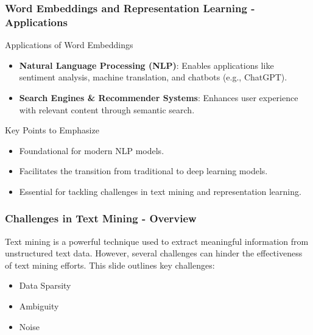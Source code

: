 \documentclass[aspectratio=169]{beamer}
\begin{document}
\begin{frame}[fragile]
    \frametitle{Word Embeddings and Representation Learning - Applications}
    \begin{block}{Applications of Word Embeddings}
        \begin{itemize}
            \item \textbf{Natural Language Processing (NLP)}: Enables applications like sentiment analysis, machine translation, and chatbots (e.g., ChatGPT).
            \item \textbf{Search Engines \& Recommender Systems}: Enhances user experience with relevant content through semantic search.
        \end{itemize}
    \end{block}
    
    \begin{block}{Key Points to Emphasize}
        \begin{itemize}
            \item Foundational for modern NLP models.
            \item Facilitates the transition from traditional to deep learning models.
            \item Essential for tackling challenges in text mining and representation learning.
        \end{itemize}
    \end{block}
\end{frame}

\begin{frame}[fragile]
    \frametitle{Challenges in Text Mining - Overview}
    Text mining is a powerful technique used to extract meaningful information from unstructured text data. However, several challenges can hinder the effectiveness of text mining efforts. This slide outlines key challenges:
    \begin{itemize}
        \item Data Sparsity
        \item Ambiguity
        \item Noise
    \end{itemize}
\end{frame}
\end{document}
